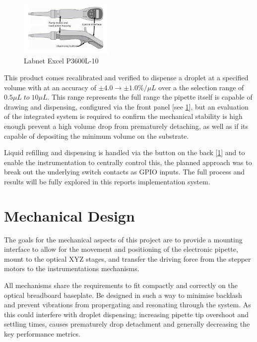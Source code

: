 \begin{figure}[h]
    \centering
    \includegraphics[width=0.4\textwidth]{img/epip.png}
    \caption{Labnet Excel P3600L-10}
    \label{fig:pip_dia}
\end{figure}

This product comes recalibrated and verified to dispense a droplet at a specified volume with at an accuracy of $\pm 4.0\rightarrow \pm 1.0 \%/\mu L$ over a the selection range of $0.5\mu L \; to \; 10\mu L$. This range represents the full range the pipette itself is capable of drawing and dispensing, configured via the front panel [see \ref{fig:pip_dia}], but an evaluation of the integrated system is required to confirm the mechanical stability is high enough prevent a high volume drop from prematurely detaching, as well as if its capable of depositing the minimum volume on the substrate.


Liquid refilling and dispensing is handled via the button on the back [\ref{fig:pip_dia}] and to enable the instrumentation to centrally control this, the planned approach was to break out the underlying switch contacts as GPIO inputs. The full process and results will be fully explored in this reports implementation system.


\section{Mechanical Design}

The goals for the mechanical aspects of this project are to provide a mounting interface to allow for the movement and positioning of the electronic pipette, mount to the optical XYZ stages, and transfer the driving force from the stepper motors to the instrumentations mechanisms.

All mechanisms share the requirements to fit compactly and correctly on the optical breadboard baseplate. Be designed in such a way to minimise backlash and prevent vibrations from propergating and resonating through the system. As this could interfere with droplet dispensing; increasing pipette tip overshoot and settling times, causes prematurely drop detachment and generally decreasing the key performance metrics.

